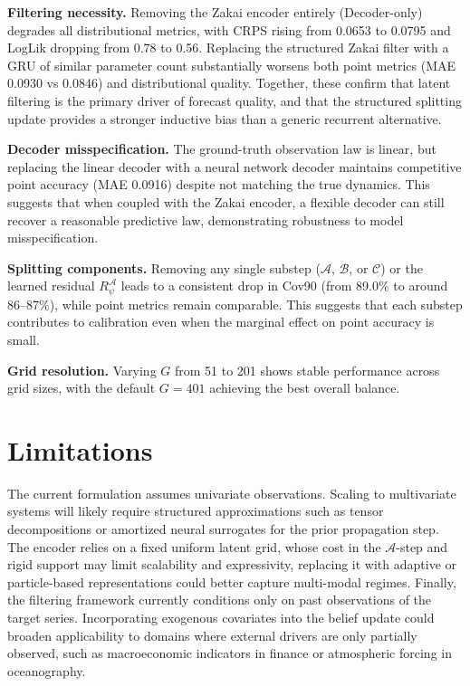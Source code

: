 \documentclass{article}
\begin{document}
\textbf{Filtering necessity.} Removing the Zakai encoder entirely (Decoder-only) degrades all distributional metrics, with CRPS rising from 0.0653 to 0.0795 and LogLik dropping from 0.78 to 0.56. Replacing the structured Zakai filter with a GRU of similar parameter count substantially worsens both point metrics (MAE 0.0930 vs 0.0846) and distributional quality. Together, these confirm that latent filtering is the primary driver of forecast quality, and that the structured splitting update provides a stronger inductive bias than a generic recurrent alternative.

\textbf{Decoder misspecification.} The ground-truth observation law is linear, but replacing the linear decoder with a neural network decoder maintains competitive point accuracy (MAE 0.0916) despite not matching the true dynamics. This suggests that when coupled with the Zakai encoder, a flexible decoder can still recover a reasonable predictive law, demonstrating robustness to model misspecification.

\textbf{Splitting components.} Removing any single substep ($\mathcal{A}$, $\mathcal{B}$, or $\mathcal{C}$) or the learned residual $R_\psi^{\mathcal{A}}$ leads to a consistent drop in Cov90 (from 89.0\% to around 86--87\%), while point metrics remain comparable. This suggests that each substep contributes to calibration even when the marginal effect on point accuracy is small.

\textbf{Grid resolution.} Varying $G$ from 51 to 201 shows stable performance across grid sizes, with the default $G=401$ achieving the best overall balance. 

\section{Limitations}
\label{app:limitation}
The current formulation assumes univariate observations. Scaling to multivariate systems will likely require structured approximations such as tensor decompositions or amortized neural surrogates for the prior propagation step. The encoder relies on a fixed uniform latent grid, whose cost in the $\mathcal{A}$-step and rigid support may limit scalability and expressivity, replacing it with adaptive or particle-based representations could better capture multi-modal regimes. Finally, the filtering framework currently conditions only on past observations of the target series. Incorporating exogenous covariates into the belief update could broaden applicability to domains where external drivers are only partially observed, such as macroeconomic indicators in finance or atmospheric forcing in oceanography.
\end{document}
